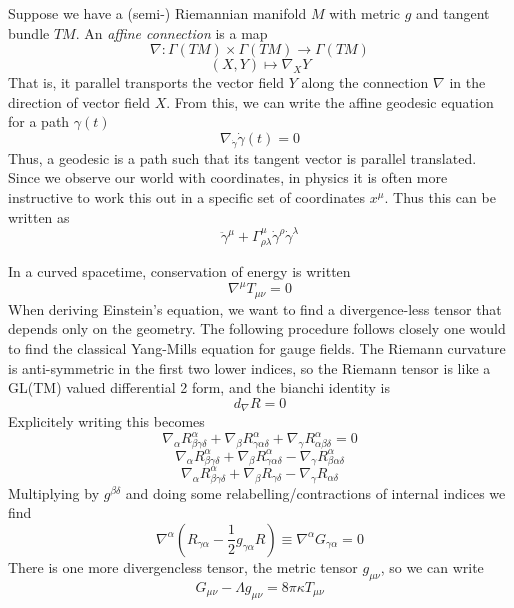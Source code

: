 Suppose we have a (semi-) Riemannian manifold $M$ with metric $g$ and tangent bundle $TM$. An \textit{affine connection} is a map
\begin{equation}
	\nabla : \Gamma (TM) \times \Gamma (TM) \rightarrow \Gamma (TM)
\end{equation}
\begin{equation}
	(X,Y) \mapsto \nabla_X Y
\end{equation}
That is, it parallel transports the vector field $Y$ along the connection $\nabla$ in the direction of vector field $X$. From this, we can write the affine geodesic equation for a path $\gamma(t)$
\begin{equation}
	\nabla_{\dot\gamma} \dot\gamma(t) = 0
\end{equation}
Thus, a geodesic is a path such that its tangent vector is parallel translated. Since we observe our world with coordinates, in physics it is often more instructive to work this out in a specific set of coordinates $x^\mu$. Thus this can be written as
\begin{equation}
	\ddot{\gamma}^\mu + \Gamma^{\mu}_{\rho\lambda}\dot{\gamma}^\rho \dot{\gamma}^\lambda 
\end{equation}

In a curved spacetime, conservation of energy is written
\begin{equation}
	\nabla^\mu T_{\mu\nu} = 0
\end{equation}
When deriving Einstein's equation, we want to find a divergence-less tensor that depends only on the geometry. The following procedure follows closely one would to find the classical Yang-Mills equation for gauge fields. The Riemann curvature is anti-symmetric in the first two lower indices, so the Riemann tensor is like a GL(TM) valued differential 2 form, and the bianchi identity is
\begin{equation}
	d_{\nabla} R = 0
\end{equation}
Explicitely writing this becomes
\[ \nabla_{\alpha} R^{\alpha}_{\beta\gamma\delta} + \nabla_{\beta}R^{\alpha}_{\gamma\alpha\delta} + \nabla_{\gamma}R^{\alpha}_{\alpha\beta\delta} = 0 \]
\[ \nabla_{\alpha} R^{\alpha}_{\beta\gamma\delta} + \nabla_{\beta}R^{\alpha}_{\gamma\alpha\delta} - \nabla_{\gamma}R^{\alpha}_{\beta\alpha\delta} \]
\[ \nabla_{\alpha}R^{\alpha}_{\beta\gamma\delta} + \nabla_{\beta}R_{\gamma\delta} - \nabla_{\gamma}R_{\alpha\delta} \]
Multiplying by $g^{\beta\delta}$ and doing some relabelling/contractions of internal indices we find
\begin{equation}
	\nabla^\alpha(R_{\gamma\alpha}-\frac{1}{2}g_{\gamma\alpha}R) \equiv \nabla^{\alpha}G_{\gamma\alpha} = 0
\end{equation}
There is one more divergencless tensor, the metric tensor $g_{\mu\nu}$, so we can write
\begin{equation}
	G_{\mu\nu} - \Lambda g_{\mu\nu} = 8\pi\kappa T_{\mu\nu}
\end{equation}

